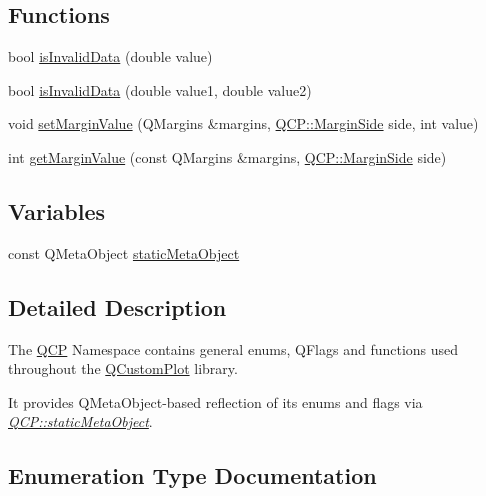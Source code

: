 \subsection*{Functions}
\begin{DoxyCompactItemize}
\item 
bool \hyperlink{namespace_q_c_p_a07ab701c05329089f933b9cae2638a63}{is\+Invalid\+Data} (double value)
\item 
bool \hyperlink{namespace_q_c_p_a728903e5c3dd17847bee280f4005496f}{is\+Invalid\+Data} (double value1, double value2)
\item 
void \hyperlink{namespace_q_c_p_afbf6e3084c108f2bb4372107945ee82f}{set\+Margin\+Value} (Q\+Margins \&margins, \hyperlink{namespace_q_c_p_a7e487e3e2ccb62ab7771065bab7cae54}{Q\+C\+P\+::\+Margin\+Side} side, int value)
\item 
int \hyperlink{namespace_q_c_p_a23a2679d3495c444acc26acc61e35b5b}{get\+Margin\+Value} (const Q\+Margins \&margins, \hyperlink{namespace_q_c_p_a7e487e3e2ccb62ab7771065bab7cae54}{Q\+C\+P\+::\+Margin\+Side} side)
\end{DoxyCompactItemize}
\subsection*{Variables}
\begin{DoxyCompactItemize}
\item 
const Q\+Meta\+Object \hyperlink{namespace_q_c_p_a07ffa1eb1537a3b1f218ff2a442b2017}{static\+Meta\+Object}
\end{DoxyCompactItemize}


\subsection{Detailed Description}
The \hyperlink{namespace_q_c_p}{Q\+CP} Namespace contains general enums, Q\+Flags and functions used throughout the \hyperlink{class_q_custom_plot}{Q\+Custom\+Plot} library.

It provides Q\+Meta\+Object-\/based reflection of its enums and flags via {\itshape \hyperlink{namespace_q_c_p_a07ffa1eb1537a3b1f218ff2a442b2017}{Q\+C\+P\+::static\+Meta\+Object}}. 

\subsection{Enumeration Type Documentation}
\mbox{\label{namespace_q_c_p_ae55dbe315d41fe80f29ba88100843a0c}} 
